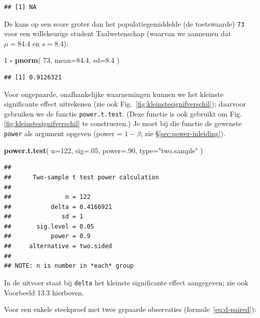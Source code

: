 \documentclass[
]{book}
\newenvironment{Shaded}{\begin{snugshade}}{\end{snugshade}}
\newcommand{\DataTypeTok}[1]{\textcolor[rgb]{0.13,0.29,0.53}{#1}}
\newcommand{\DecValTok}[1]{\textcolor[rgb]{0.00,0.00,0.81}{#1}}
\newcommand{\FloatTok}[1]{\textcolor[rgb]{0.00,0.00,0.81}{#1}}
\newcommand{\KeywordTok}[1]{\textcolor[rgb]{0.13,0.29,0.53}{\textbf{#1}}}
\newcommand{\NormalTok}[1]{#1}
\newcommand{\OperatorTok}[1]{\textcolor[rgb]{0.81,0.36,0.00}{\textbf{#1}}}
\newcommand{\StringTok}[1]{\textcolor[rgb]{0.31,0.60,0.02}{#1}}
\begin{document}
\begin{verbatim}
## [1] NA
\end{verbatim}

De kans op een score groter dan het populatiegemiddelde (de toetswaarde) \texttt{73} voor een willekeurige student Taalwetenschap (waarvan we aannemen dat \(\mu=84.4\) en \(s=8.4\)):

\begin{Shaded}
\begin{Highlighting}[]
\DecValTok{1} \OperatorTok{{-}}\StringTok{ }\KeywordTok{pnorm}\NormalTok{( }\DecValTok{73}\NormalTok{, }\DataTypeTok{mean=}\FloatTok{84.4}\NormalTok{, }\DataTypeTok{sd=}\FloatTok{8.4}\NormalTok{ ) }
\end{Highlighting}
\end{Shaded}

\begin{verbatim}
## [1] 0.9126321
\end{verbatim}

Voor ongepaarde, onafhankelijke waarnemingen kunnen we het kleinste
significante effect uitrekenen (zie ook
Fig.~\ref{fig:kleinstesignifverschil}); daarvoor gebruiken we de functie \texttt{power.t.test}. (Deze functie is ook gebruikt om Fig.\ref{fig:kleinstesignifverschil} te construeren.)
Je moet bij die functie de gewenste \texttt{power} als
argument opgeven (power = \(1-\beta\); zie
§\ref{sec:power-inleiding}).

\begin{Shaded}
\begin{Highlighting}[]
\KeywordTok{power.t.test}\NormalTok{( }\DataTypeTok{n=}\DecValTok{122}\NormalTok{, }\DataTypeTok{sig=}\NormalTok{.}\DecValTok{05}\NormalTok{, }\DataTypeTok{power=}\NormalTok{.}\DecValTok{90}\NormalTok{, }\DataTypeTok{type=}\StringTok{"two.sample"}\NormalTok{ )}
\end{Highlighting}
\end{Shaded}

\begin{verbatim}
## 
##      Two-sample t test power calculation 
## 
##               n = 122
##           delta = 0.4166921
##              sd = 1
##       sig.level = 0.05
##           power = 0.9
##     alternative = two.sided
## 
## NOTE: n is number in *each* group
\end{verbatim}

In de uitvoer staat bij \texttt{delta} het kleinste significante effect aangegeven; zie ook Voorbeeld 13.3 hierboven.

Voor een enkele steekproef met twee gepaarde observaties
(formule~\eqref{eq:d-paired}):
\end{document}
